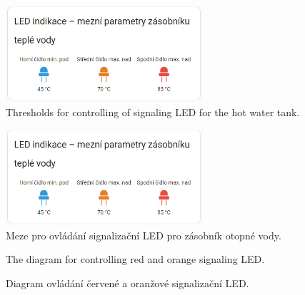 \begin{English}
\begin{figure}[H]
    \centering
    \includegraphics[width=0.65\textwidth]{pictures/czech/software/led-indication.png}
    \caption{Thresholds for controlling of signaling LED for the hot water tank.}
    \label{fig:led-indication}
\end{figure}
\end{English}

\begin{Czech}
\begin{figure}[H]
    \centering
    \includegraphics[width=0.65\textwidth]{pictures/czech/software/led-indication.png}
    \caption{Meze pro ovládání signalizační LED pro zásobník otopné vody.}
    \label{fig:led-indication}
\end{figure}
\end{Czech}


\begin{English}
\begin{figure}[H]
    \centering
    \def\svgwidth{1\columnwidth}
    \graphicspath{{pictures/czech/software/svg/}}
    
    \caption{The diagram for controlling red and orange signaling LED.}
    \label{fig:diagram-red-orange-led-indication}
\end{figure}
\end{English}

\begin{Czech}
\begin{figure}[H]
    \centering
    \def\svgwidth{1\columnwidth}
    \graphicspath{{pictures/czech/software/svg/}}
    
    \caption{Diagram ovládání červené a oranžové signalizační LED.}
    \label{fig:diagram-red-orange-led-indication}
\end{figure}
\end{Czech}



